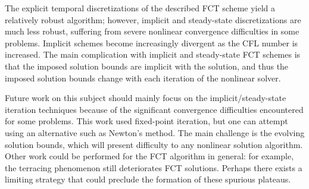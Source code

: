 The explicit temporal discretizations of the described FCT scheme yield a
relatively robust algorithm; however, implicit and steady-state discretizations
are much less robust, suffering from severe nonlinear convergence difficulties
in some problems. Implicit schemes become increasingly divergent as the CFL
number is increased. The main complication with implicit and steady-state
FCT schemes is that the imposed solution bounds are implicit with the solution,
and thus the imposed solution bounds change with each iteration of the
nonlinear solver.

Future work on this subject should mainly focus on the implicit/steady-state
iteration techniques because of the significant convergence difficulties
encountered for some problems. This work used fixed-point iteration, but
one can attempt using an alternative such as Newton's method. The main
challenge is the evolving solution bounds, which will present difficulty
to any nonlinear solution algorithm. Other work could be performed for
the FCT algorithm in general: for example, the terracing phenomenon still
deteriorates FCT solutions. Perhaps there exists a limiting strategy that
could preclude the formation of these spurious plateaus.
